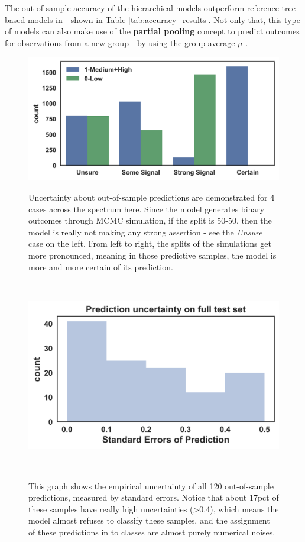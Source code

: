 \documentclass{sigchi}
\begin{document}
The out-of-sample accuracy of the hierarchical models outperform reference tree-based models in \cite{amrieh2016mining} - shown in Table \ref{tab:accuracy_results}. Not only that, this type of models can also make use of the \textbf{partial pooling} concept to predict outcomes for observations from a new group - by using the group average $\mu$ \cite{gelmanbayesian}.

\begin{figure}
	\centering
	\includegraphics[width=0.95\columnwidth]{figures/prediction_ci.png}
	\caption{
		Uncertainty about out-of-sample predictions are demonstrated for 4 cases across the spectrum here. Since the model generates binary outcomes through MCMC simulation, if the split is 50-50, then the model is really not making any strong assertion - see the \textit{Unsure} case on the left. From left to right, the splits of the simulations get more pronounced, meaning in those predictive samples, the model is more and more certain of its prediction.
	}~\label{fig:pred_ci}	
	
	\centering
	\includegraphics[width=0.95\columnwidth]{figures/prediction_se.png}
	\caption{
		This graph shows the empirical uncertainty of all 120 out-of-sample predictions, measured by standard errors. Notice that about 17pct of these samples have really high uncertainties (>0.4), which means the model almost refuses to classify these samples, and the assignment of these predictions in to classes are almost purely numerical noises.
	}~\label{fig:pred_se}	
	
\end{figure}
\end{document}
